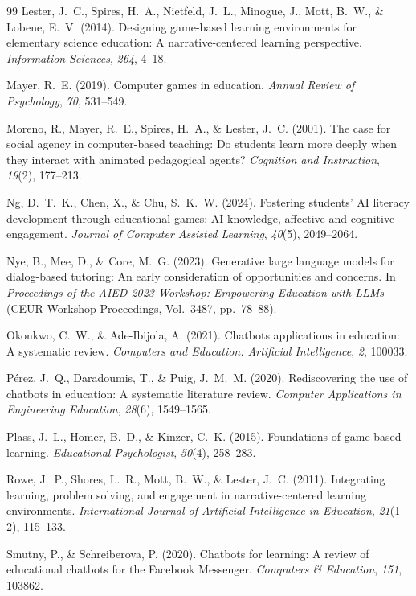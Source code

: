 \documentclass[11pt,a4paper]{article}
\begin{document}
\begin{thebibliography}{99}
Lester, J.~C., Spires, H.~A., Nietfeld, J.~L., Minogue, J., Mott, B.~W., \& Lobene, E.~V. (2014). Designing game-based learning environments for elementary science education: A narrative-centered learning perspective. \textit{Information Sciences}, \textit{264}, 4--18.

Mayer, R.~E. (2019). Computer games in education. \textit{Annual Review of Psychology}, \textit{70}, 531--549.

Moreno, R., Mayer, R.~E., Spires, H.~A., \& Lester, J.~C. (2001). The case for social agency in computer-based teaching: Do students learn more deeply when they interact with animated pedagogical agents? \textit{Cognition and Instruction}, \textit{19}(2), 177--213.

Ng, D.~T.~K., Chen, X., \& Chu, S.~K.~W. (2024). Fostering students' AI literacy development through educational games: AI knowledge, affective and cognitive engagement. \textit{Journal of Computer Assisted Learning}, \textit{40}(5), 2049--2064.

Nye, B., Mee, D., \& Core, M.~G. (2023). Generative large language models for dialog-based tutoring: An early consideration of opportunities and concerns. In \textit{Proceedings of the AIED 2023 Workshop: Empowering Education with LLMs} (CEUR Workshop Proceedings, Vol.~3487, pp.~78--88).

Okonkwo, C.~W., \& Ade-Ibijola, A. (2021). Chatbots applications in education: A systematic review. \textit{Computers and Education: Artificial Intelligence}, \textit{2}, 100033.

P\'{e}rez, J.~Q., Daradoumis, T., \& Puig, J.~M.~M. (2020). Rediscovering the use of chatbots in education: A systematic literature review. \textit{Computer Applications in Engineering Education}, \textit{28}(6), 1549--1565.

Plass, J.~L., Homer, B.~D., \& Kinzer, C.~K. (2015). Foundations of game-based learning. \textit{Educational Psychologist}, \textit{50}(4), 258--283.

Rowe, J.~P., Shores, L.~R., Mott, B.~W., \& Lester, J.~C. (2011). Integrating learning, problem solving, and engagement in narrative-centered learning environments. \textit{International Journal of Artificial Intelligence in Education}, \textit{21}(1--2), 115--133.

Smutny, P., \& Schreiberova, P. (2020). Chatbots for learning: A review of educational chatbots for the Facebook Messenger. \textit{Computers \& Education}, \textit{151}, 103862.


\end{thebibliography}
\end{document}
